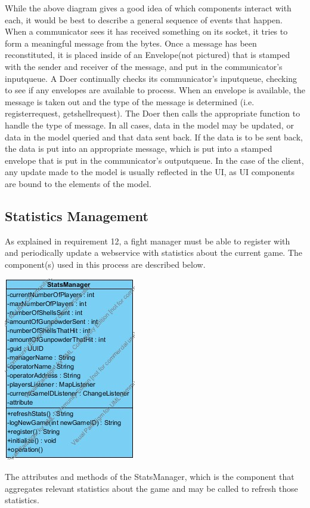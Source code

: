 \documentclass[12pt]{article}
\begin{document}
			While the above diagram gives a good idea of which components interact with each, it would be best to describe a general sequence of events that happen. When a communicator sees it has received something on its socket, it tries to form a meaningful message from the bytes. Once a message has been reconstituted, it is placed inside of an Envelope(not pictured) that is stamped with the sender and receiver of the message, and put in the communicator's inputqueue. A Doer continually checks its communicator's inputqueue, checking to see if any envelopes are available to process. When an envelope is available, the message is taken out and the type of the message is determined (i.e. registerrequest, getshellrequest). The Doer then calls the appropriate function to handle the type of message. In all cases, data in the model may be updated, or data in the model queried and that data sent back. If the data is to be sent back, the data is put into an appropriate message, which is put into a stamped envelope that is put in the communicator's outputqueue. In the case of the client, any update made to the model is usually reflected in the UI, as UI components are bound to the elements of the model.
		\subsection{Statistics Management}
			As explained in requirement 12, a fight manager must be able to register with and periodically update a webservice with statistics about the current game. The component(s) used in this process are described below.
			\begin{center}
				\includegraphics[width=.3\textwidth]{Diagrams/Structure Diagrams/StatsManager.jpg}
			\end{center}
			The attributes and methods of the StatsManager, which is the component that aggregates relevant statistics about the game and may be called to refresh those statistics.
			
\end{document}
